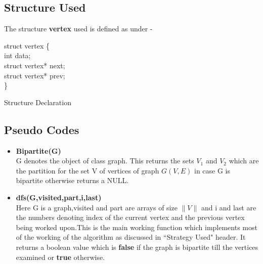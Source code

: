\documentclass[20pt]{article}
\begin{document}
\newcommand\mycommfont[1]{\small\ttfamily\textcolor{blue}{#1}}

\subsection{Structure Used}

The structure \textbf{vertex} used is defined as under -
\begin{algorithm}

	struct vertex \{ \\
		\hspace{1cm} int data; \\
		\hspace{1cm} struct vertex* next; \\
		\hspace{1cm} struct vertex* prev; \\
	\}

	\caption{Structure Declaration}

\end{algorithm}

\subsection{Pseudo Codes}

\begin{itemize}
\item \textbf{Bipartite(G)} \\
G denotes the object of class graph. This returns the sets $V_1$ and $V_2$ which are the partition for the set V of vertices of graph $G(V,E)$ in case G is bipartite otherwise returns a NULL.
\item \textbf{dfs(G,visited,part,i,last)} \\
Here G is a graph,visited and part are arrays of size $\|V\|$ and i and last are the numbers denoting index of the current vertex and the previous vertex being worked upon.This is the main working function which implements most of the working of the algorithm as discussed in ``Strategy Used" header. It returns a boolean value which is \textbf{false} if the graph is bipartite till the vertices examined or \textbf{true} otherwise.
\end{itemize}
\end{document}
